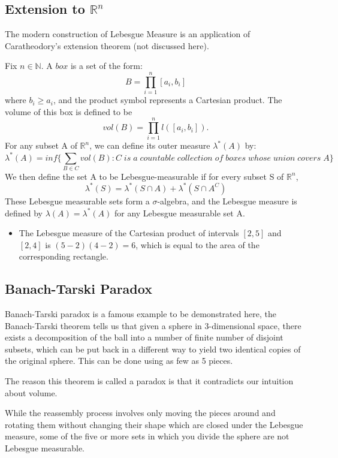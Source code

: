 \documentclass{article}
\begin{document}
\subsection{Extension to $\mathbb{R}^n$}

The modern construction of Lebesgue Measure is an application of 
Caratheodory's extension theorem (not discussed here).

Fix $n \in \mathbb{N}$. A $box$ is a set of the form:
$$ B= \prod_{i=1}^{n}[a_i,b_i]$$
where $b_i \geq a_i$, and the product symbol represents a Cartesian product. The volume of this box is defined to be
$$ vol(B)=\prod_{i=1}^{n}l([a_i,b_i]).$$
For any subset A of $\mathbb{R}^n$, we can define its outer measure $\lambda^{*}(A)$ by:
$$\lambda^{*}(A)=inf\Big\{ \sum_{B \in C}vol(B): C\; is\; a\; countable \;collection\; of \;boxes\; whose\; union\; covers \; A\Big\}$$
We then define the set A to be Lebesgue-measurable if for every subset S of $\mathbb{R}^n$, 
$$\lambda^{*}(S)= \lambda^{*}(S \cap A) + \lambda^{*}(S \cap A^C)$$
These Lebesgue measurable sets form a $\sigma$-algebra, and the Lebesgue measure is defined by $\lambda(A)=\lambda^{*}(A)$ for any Lebesgue measurable set A.
\begin{itemize}
    \item The Lebesgue measure of the Cartesian product of intervals $[2, 5]$ and $[2, 4]$ is $(5-2)(4-2) = 6$, which is equal to the area of the corresponding rectangle.
\end{itemize}

\subsection{Banach-Tarski Paradox}
Banach-Tarski paradox is a famous example to be demonstrated here, the Banach-Tarski theorem tells us that given a sphere in 3-dimensional space, there exists a decomposition of the ball into a number of finite number of disjoint subsets, which can be put back in a different way to yield two identical copies of the original sphere. This can be done using as few as 5 pieces.\medskip

The reason this theorem is called a paradox is that it contradicts our intuition about volume.

While the reassembly process involves only moving the pieces around and rotating them without changing their shape which are closed under the Lebesgue measure, some of the five or more sets in which you divide the sphere are not Lebesgue measurable.
\end{document}
